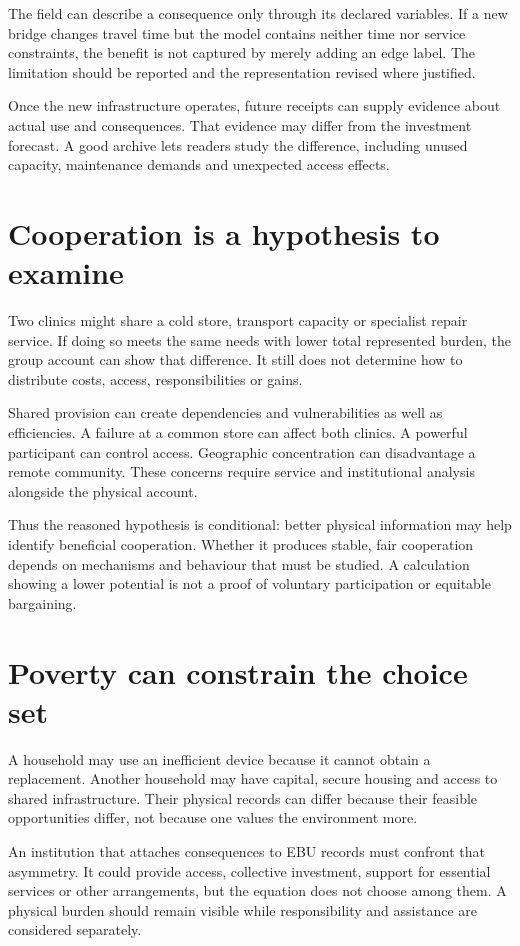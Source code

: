 The field can describe a consequence only through its declared variables. If a new bridge changes travel time but the model contains neither time nor service constraints, the benefit is not captured by merely adding an edge label. The limitation should be reported and the representation revised where justified.

Once the new infrastructure operates, future receipts can supply evidence about actual use and consequences. That evidence may differ from the investment forecast. A good archive lets readers study the difference, including unused capacity, maintenance demands and unexpected access effects.

\section{Cooperation is a hypothesis to examine}
Two clinics might share a cold store, transport capacity or specialist repair service. If doing so meets the same needs with lower total represented burden, the group account can show that difference. It still does not determine how to distribute costs, access, responsibilities or gains.

Shared provision can create dependencies and vulnerabilities as well as efficiencies. A failure at a common store can affect both clinics. A powerful participant can control access. Geographic concentration can disadvantage a remote community. These concerns require service and institutional analysis alongside the physical account.

Thus the reasoned hypothesis is conditional: better physical information may help identify beneficial cooperation. Whether it produces stable, fair cooperation depends on mechanisms and behaviour that must be studied. A calculation showing a lower potential is not a proof of voluntary participation or equitable bargaining.

\section{Poverty can constrain the choice set}
A household may use an inefficient device because it cannot obtain a replacement. Another household may have capital, secure housing and access to shared infrastructure. Their physical records can differ because their feasible opportunities differ, not because one values the environment more.

An institution that attaches consequences to EBU records must confront that asymmetry. It could provide access, collective investment, support for essential services or other arrangements, but the equation does not choose among them. A physical burden should remain visible while responsibility and assistance are considered separately.

